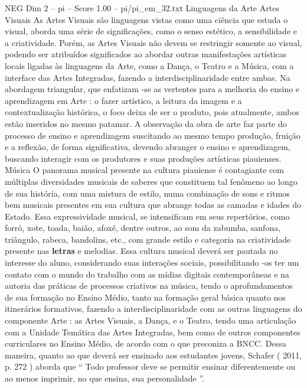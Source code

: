 \begin{textsample}{NEG Dim 2 – pi – Score 1.00 – pi/pi\_em\_32.txt}  \label{ex:f2_neg_199}
Linguagens da Arte Artes Visuais As Artes Visuais são linguagens vistas como uma ciência que estuda o visual, aborda uma série de significações, como o senso estético, a sensibilidade e a criatividade.
Porém, as Artes Visuais não devem se restringir somente ao visual, podendo ser atribuídos significados ao abordar outras manifestações artísticas locais ligadas às linguagens da Arte, como a Dança, o Teatro e a Música, com a interface das Artes Integradas, fazendo a interdisciplinaridade entre ambas.
Na abordagem triangular, que enfatizam -se as vertentes para a melhoria do ensino e aprendizagem em Arte : o fazer artístico, a leitura da imagem e a contextualização histórica, o foco deixa de ser o produto, pois atualmente, ambos estão inseridos no mesmo patamar.
A observação da obra de arte faz parte do processo de ensino e aprendizagem suscitando ao mesmo tempo produção, fruição e a reflexão, de forma significativa, devendo abranger o ensino e aprendizagem, buscando interagir com os produtores e suas produções artísticas piauienses.
Música O panorama musical presente na cultura piauiense é contagiante com múltiplas diversidades musicais de saberes que constituem tal fenômeno ao longo de sua história, com uma mistura de estilo, numa combinação de sons e ritmos bem musicais presentes em sua cultura que abrange todas as camadas e idades do Estado.
Essa expressividade musical, se intensificam em seus repertórios, como forró, xote, toada, baião, afoxé, dentre outros, ao som da zabumba, sanfona, triângulo, rabeca, bandolins, etc., com grande estilo e categoria na criatividade presente nas \textbf{letras} e melodias.
Essa cultura musical deverá ser pautada no interesse do aluno, considerando suas interações sociais, possibilitando -os ter um contato com o mundo do trabalho com as mídias digitais contemporâneas e na autoria das práticas de processos criativos na música, tendo o aprofundamentos de sua formação no Ensino Médio, tanto na formação geral básica quanto nos itinerários formativos, fazendo a interdisciplinaridade com as outras linguagens do componente Arte : as Artes Visuais, a Dança, e o Teatro, tendo uma articulação com a Unidade Temática das Artes Integradas, bem como de outros componentes curriculares no Ensino Médio, de acordo com o que preconiza a BNCC.
Dessa maneira, quanto ao que deverá ser ensinado aos estudantes jovens, Schafer ( 2011, p. 272 ) aborda que “ Todo professor deve se permitir ensinar diferentemente ou ao menos imprimir, no que ensina, sua personalidade ”.

\end{textsample}
